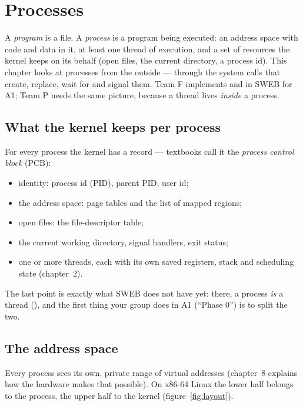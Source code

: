 \chapter{Processes}
\label{ch:processes}

A \emph{program} is a file. A \emph{process} is a program being executed:
an address space with code and data in it, at least one thread of
execution, and a set of resources the kernel keeps on its behalf (open
files, the current directory, a process id). This chapter looks at
processes from the outside --- through the system calls that create,
replace, wait for and signal them. Team F implements  and
 in SWEB for A1; Team P needs the same picture, because a
thread lives \emph{inside} a process.

\section{What the kernel keeps per process}

For every process the kernel has a record --- textbooks call it the
\emph{process control block} (PCB):

\begin{itemize}
  \item identity: process id (PID), parent PID, user id;
  \item the address space: page tables and the list of mapped regions;
  \item open files: the file-descriptor table;
  \item the current working directory, signal handlers, exit status;
  \item one or more threads, each with its own saved registers, stack and
    scheduling state (chapter~2).
\end{itemize}

The last point is exactly what SWEB does not have yet: there, a process
\emph{is} a thread (), and the
first thing your group does in A1 (``Phase 0'') is to split the two.

\section{The address space}

Every process sees its own, private range of virtual addresses
(chapter~8 explains how the hardware makes that possible). On x86-64
Linux the lower half belongs to the process, the upper half to the
kernel (figure~\ref{fig:layout}).

